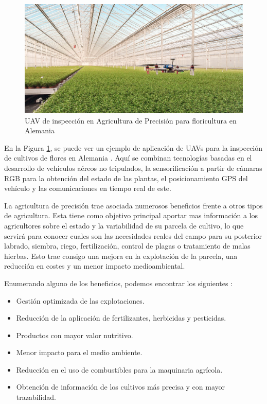 \begin{figure}
    \centering
    \includegraphics[width=\textwidth]{figuras/estado del arte/dron_inspeccion.jpg}
    \caption{UAV de inspección en Agricultura de Precisión para floricultura en Alemania}
    \label{fig:dron_inspeccion}
\end{figure}

En la Figura \ref{fig:dron_inspeccion}, se puede ver un ejemplo de aplicación de UAVs para la inspección de cultivos de flores en Alemania \cite{job-wizards}. Aquí se combinan tecnologías basadas en el desarrollo de vehículos aéreos no tripulados, la sensorificación a partir de cámaras RGB para la obtención del estado de las plantas, el posicionamiento GPS del vehículo y las comunicaciones en tiempo real de este.

La agricultura de precisión trae asociada numerosos beneficios frente a otros tipos de agricultura. Esta tiene como objetivo principal aportar mas información a los agricultores sobre el estado y la variabilidad de su parcela de cultivo, lo que servirá para conocer cuales son las necesidades reales del campo para su posterior labrado, siembra, riego, fertilización, control de plagas o tratamiento de malas hierbas. Esto trae consigo una mejora en la explotación de la parcela, una reducción en costes y un menor impacto medioambiental.

Enumerando alguno de los beneficios, podemos encontrar los siguientes \cite{Garcia2008}:
\begin{itemize}
    \item Gestión optimizada de las explotaciones.
    \item Reducción de la aplicación de fertilizantes, herbicidas y pesticidas.
    \item Productos con mayor valor nutritivo.
    \item Menor impacto para el medio ambiente.
    \item Reducción en el uso de combustibles para la maquinaria agrícola.
    \item Obtención de información de los cultivos más precisa y con mayor trazabilidad.
\end{itemize}

